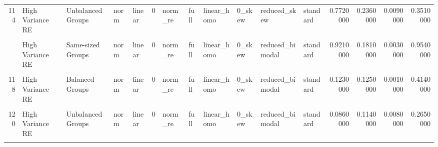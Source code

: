 \documentclass[12pt]{article}
\begin{document}
\begin{table}
{\begin{tabular}[t]{rllllrllllllrrrr}
114 & High Variance RE & Unbalanced Groups & norm & linear & 0 & norm\_re & full & linear\_homo & 0\_skew & reduced\_skew & standard & 0.7720000 & 0.2360000 & 0.0090000 & 0.3510000\\
\cellcolor{gray!6}{115} & \cellcolor{gray!6}{High Variance Error} & \cellcolor{gray!6}{Same-sized Groups} & \cellcolor{gray!6}{norm} & \cellcolor{gray!6}{linear} & \cellcolor{gray!6}{0} & \cellcolor{gray!6}{norm\_re} & \cellcolor{gray!6}{full} & \cellcolor{gray!6}{linear\_homo} & \cellcolor{gray!6}{0\_skew} & \cellcolor{gray!6}{reduced\_bimodal} & \cellcolor{gray!6}{standard} & \cellcolor{gray!6}{0.0480000} & \cellcolor{gray!6}{0.1020000} & \cellcolor{gray!6}{0.0790000} & \cellcolor{gray!6}{0.5030000}\\
\addlinespace
116 & High Variance RE & Same-sized Groups & norm & linear & 0 & norm\_re & full & linear\_homo & 0\_skew & reduced\_bimodal & standard & 0.9210000 & 0.1810000 & 0.0030000 & 0.9540000\\
\cellcolor{gray!6}{117} & \cellcolor{gray!6}{High Variance Error} & \cellcolor{gray!6}{Balanced Groups} & \cellcolor{gray!6}{norm} & \cellcolor{gray!6}{linear} & \cellcolor{gray!6}{0} & \cellcolor{gray!6}{norm\_re} & \cellcolor{gray!6}{full} & \cellcolor{gray!6}{linear\_homo} & \cellcolor{gray!6}{0\_skew} & \cellcolor{gray!6}{reduced\_bimodal} & \cellcolor{gray!6}{standard} & \cellcolor{gray!6}{0.0470000} & \cellcolor{gray!6}{0.1030000} & \cellcolor{gray!6}{0.6030000} & \cellcolor{gray!6}{0.1110000}\\
118 & High Variance RE & Balanced Groups & norm & linear & 0 & norm\_re & full & linear\_homo & 0\_skew & reduced\_bimodal & standard & 0.1230000 & 0.1250000 & 0.0010000 & 0.4140000\\
\cellcolor{gray!6}{119} & \cellcolor{gray!6}{High Variance Error} & \cellcolor{gray!6}{Unbalanced Groups} & \cellcolor{gray!6}{norm} & \cellcolor{gray!6}{linear} & \cellcolor{gray!6}{0} & \cellcolor{gray!6}{norm\_re} & \cellcolor{gray!6}{full} & \cellcolor{gray!6}{linear\_homo} & \cellcolor{gray!6}{0\_skew} & \cellcolor{gray!6}{reduced\_bimodal} & \cellcolor{gray!6}{standard} & \cellcolor{gray!6}{0.0520000} & \cellcolor{gray!6}{0.0840000} & \cellcolor{gray!6}{0.6760000} & \cellcolor{gray!6}{0.0790000}\\
120 & High Variance RE & Unbalanced Groups & norm & linear & 0 & norm\_re & full & linear\_homo & 0\_skew & reduced\_bimodal & standard & 0.0860000 & 0.1140000 & 0.0080000 & 0.2650000\\
\addlinespace
\cellcolor{gray!6}{121} & \cellcolor{gray!6}{High Variance Error} & \cellcolor{gray!6}{Same-sized Groups} & \cellcolor{gray!6}{norm} & \cellcolor{gray!6}{linear} & \cellcolor{gray!6}{0} & \cellcolor{gray!6}{norm\_re} & \cellcolor{gray!6}{full} & \cellcolor{gray!6}{linear\_homo} & \cellcolor{gray!6}{0\_skew} & \cellcolor{gray!6}{linear\_norm} & \cellcolor{gray!6}{ar\_error} & \cellcolor{gray!6}{0.0700000} & \cellcolor{gray!6}{0.1210000} & \cellcolor{gray!6}{0.0160000} & \cellcolor{gray!6}{0.0460000}\\

\end{tabular}}
\end{table}
\end{document}
